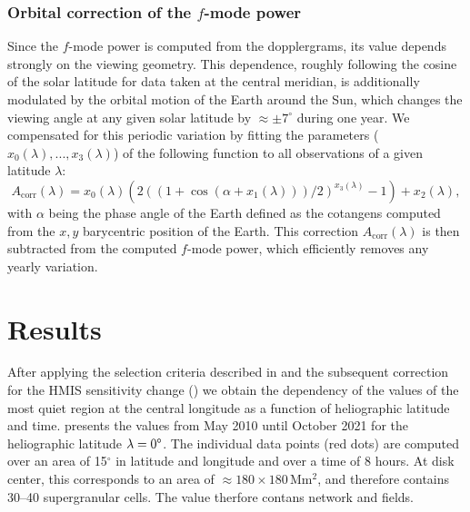 \documentclass{aa}
\begin{document}
\subsubsection*{Orbital correction of the $f$-mode power}

Since the $f$-mode power is computed from the \los{} dopplergrams, its value depends strongly on the viewing geometry. This dependence,  roughly following the cosine of the solar latitude for data taken at the central meridian, is additionally modulated by the orbital motion of the Earth around the Sun, which changes the viewing angle at any given solar latitude by $\approx\pm7^\circ$ during one year. We compensated for this periodic variation by fitting the parameters ($x_0(\lambda), ..., x_3(\lambda)$) of the following function to all observations of a given latitude $\lambda$:
\begin{equation}
\label{eq:orbitcorr}
A_{\mbox{corr}}(\lambda) = x_0(\lambda) (  2 ( (1+\cos(\alpha+x_1(\lambda)))/2)^{x_3(\lambda)}-1   )+ x_2(\lambda),
\end{equation}
with $\alpha$ being the phase angle of the Earth defined as the cotangens computed from the $x,y$ barycentric position of the Earth.
This correction $A_{\mbox{corr}}(\lambda)$ is then subtracted from the computed $f$-mode power, which efficiently removes any yearly variation. 




\section{Results}

After applying the selection criteria described in  and the subsequent correction for the HMIS sensitivity change () we obtain the dependency of the \brms{} values of the most quiet region at the central longitude as a function of heliographic latitude and time.  presents the \brms{} values from May 2010 until October 2021 for the heliographic latitude $\lambda = 0\degree$. The individual data points (red dots) are computed over an area of 15$^\circ$ in latitude and longitude and over a time of 8 hours. At disk center, this corresponds to an area of $\approx 180 \times 180$\,Mm$^2$, and therefore contains 30--40 supergranular cells. The \brms{} value therfore contans network and \IN{} fields.
\end{document}
